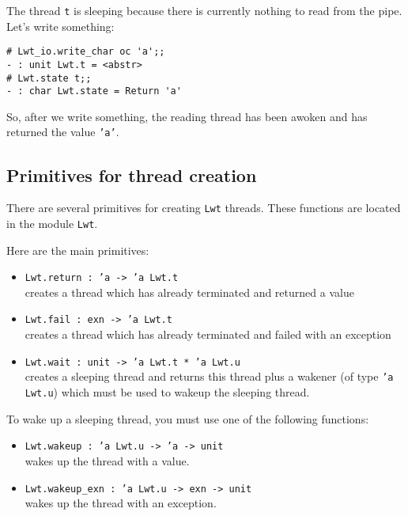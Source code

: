 The thread {\tt t} is sleeping because there is currently nothing
to read from the pipe. Let's write something:



\lstset{language=[Objective]Caml}\begin{lstlisting}
# Lwt_io.write_char oc 'a';;
- : unit Lwt.t = <abstr>
# Lwt.state t;;
- : char Lwt.state = Return 'a'
\end{lstlisting}
\medskip

\noindent
So, after we write something, the reading thread has been awoken and
has returned the value {\tt 'a'}.



\subsection{ Primitives for thread creation }

There are several primitives for creating {\tt Lwt} threads. These
functions are located in the module {\tt Lwt}.



Here are the main primitives:



\begin{itemize}
\item  {\tt Lwt.return : 'a -> 'a Lwt.t}
\mbox{}\\
creates a thread which has already terminated and returned a value
\item  {\tt Lwt.fail : exn -> 'a Lwt.t}
\mbox{}\\
creates a thread which has already terminated and failed with an
exception
\item  {\tt Lwt.wait : unit -> 'a Lwt.t * 'a Lwt.u}
\mbox{}\\
creates a sleeping thread and returns this thread plus a wakener (of
type {\tt 'a Lwt.u}) which must be used to wakeup the sleeping
thread.

\end{itemize}

To wake up a sleeping thread, you must use one of the following
functions:



\begin{itemize}
\item  {\tt Lwt.wakeup : 'a Lwt.u -> 'a -> unit}
\mbox{}\\
wakes up the thread with a value.
\item  {\tt Lwt.wakeup\_exn : 'a Lwt.u -> exn -> unit}
\mbox{}\\
wakes up the thread with an exception.

\end{itemize}

